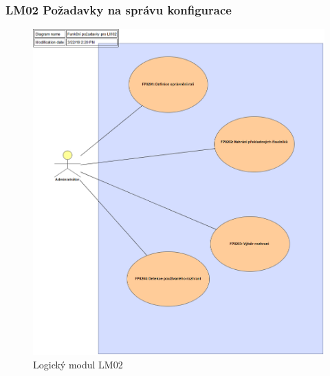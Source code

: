 \documentclass[thesis=M,czech]{FITthesis}[2019/12/23]
\begin{document}
\subsubsection{LM02 Požadavky na správu konfigurace}
\label{LM02}
\begin{figure}[H]
  \centering
  \includegraphics[width=\textwidth]{res/design/Funkční požadavky pro LM02.png}
  \caption{Logický modul LM02}
  \label{fig:Logický modul LM02}
\end{figure}
\end{document}
